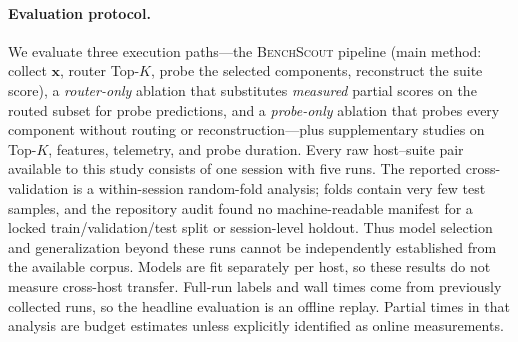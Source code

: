 \documentclass[sigconf, review, anonymous, balance=false]{acmart}
\newcommand{\ourmethod}{\textsc{BenchScout}\xspace}
\begin{document}
\paragraph{Evaluation protocol.}
We evaluate three execution paths---the \ourmethod{} pipeline (main method: collect $\mathbf{x}$, router Top-$K$, probe the selected components, reconstruct the suite score), a \emph{router-only} ablation that substitutes \emph{measured} partial scores on the routed subset for probe predictions, and a \emph{probe-only} ablation that probes every component without routing or reconstruction---plus supplementary studies on Top-$K$, features, telemetry, and probe duration.
Every raw host--suite pair available to this study consists of one session with five runs. The reported cross-validation is a within-session random-fold analysis; folds contain very few test samples, and the repository audit found no machine-readable manifest for a locked train/validation/test split or session-level holdout. Thus model selection and generalization beyond these runs cannot be independently established from the available corpus. Models are fit separately per host, so these results do not measure cross-host transfer.
Full-run labels and wall times come from previously collected runs, so the headline evaluation is an offline replay. Partial times in that analysis are budget estimates unless explicitly identified as online measurements.


\end{document}
